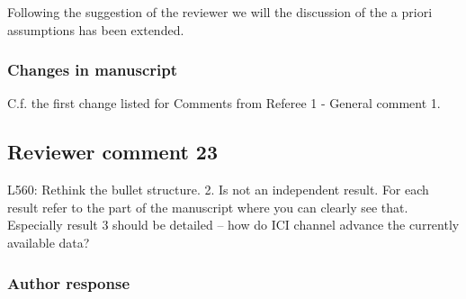 Following the suggestion of the reviewer we will  the discussion
of the a priori assumptions has been extended.

\subsubsection*{Changes in manuscript}

C.f. the first change listed for Comments from Referee 1 - General comment 1.

%

\subsection*{Reviewer comment 23}
L560:  Rethink the bullet structure.  2.  Is not an independent result.  For each result refer to the part of the manuscript where you can clearly see that.  Especially result 3 should be detailed – how do ICI channel advance the currently available data?

\subsubsection*{Author response}


